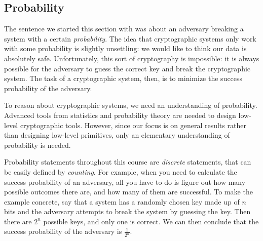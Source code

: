 \subsection{Probability}\label{foundations:probability}

The sentence we started this section with was about an adversary breaking a system with a certain \emph{probability}. The idea that cryptographic systems only work with some probability is slightly unsettling: we would like to think our data is absolutely safe. Unfortunately, this sort of cryptography is impossible: it is always possible for the adversary to guess the correct key and break the cryptographic system. The task of a cryptographic system, then, is to minimize the success probability of the adversary.

To reason about cryptographic systems, we need an understanding of probability. Advanced tools from statistics and probability theory are needed to design low-level cryptographic tools. However, since our focus is on general results rather than designing low-level primitives, only an elementary understanding of probability is needed.

Probability statements throughout this course are \emph{discrete} statements, that can be easily defined by \emph{counting}. For example, when you need to calculate the success probability of an adversary, all you have to do is figure out how many possible outcomes there are, and how many of them are successful. To make the example concrete, say that a system has a randomly chosen key made up of $n$ bits and the adversary attempts to break the system by guessing the key. Then there are $2^n$ possible keys, and only one is correct. We can then conclude that the success probability of the adversary is $\frac{1}{2^n}$.
